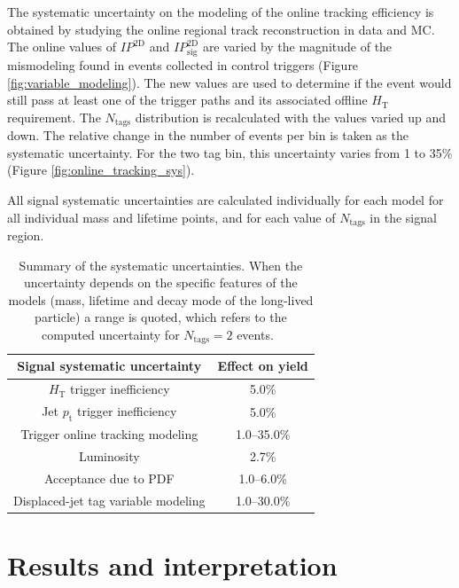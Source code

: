 The systematic uncertainty on the modeling of the online tracking
efficiency is obtained by studying the online regional track
reconstruction in data and MC. The online values of $IP^{\textrm{2D}}$
and $IP^{\textrm{2D}}_{\textrm{sig}}$ are varied by the magnitude of
the mismodeling found in events collected in control triggers (Figure \ref{fig:variable_modeling}).  The new values are used to determine if the
 event would still pass at
least one of the trigger paths and its associated offline
$H_{\textrm{T}}$ requirement. The $N_{\textrm{tags}}$ distribution is
recalculated with the values varied up and down. The relative change
in the number of events per bin is taken as the systematic
uncertainty. For the two tag bin, this uncertainty varies from
1 to 35\% (Figure \ref{fig:online_tracking_sys}).

All signal systematic uncertainties are calculated individually for
each model for all individual mass and lifetime points, and for each
value of $N_\text{tags}$ in the signal region.

\begin{table}[tb]
  \caption{Summary of the systematic uncertainties. 
    When the uncertainty depends on the specific features of the models
    (mass, lifetime and decay mode of the long-lived particle) a
    range is quoted, which refers to the computed uncertainty for $N_{\textrm{tags}}=2$ events.~\label{tab:sigSys}}
\begin{center}
\begin{tabular}{cc}
\textbf{Signal systematic uncertainty} & \textbf{Effect on yield} \\
\hline
$H_{\textrm{T}}$ trigger inefficiency &  5.0\% \\
Jet $p_{\textrm{t}}$ trigger inefficiency  & 5.0\% \\
Trigger online tracking modeling & 1.0--35.0\% \\
Luminosity & 2.7\% \\
Acceptance due to PDF & 1.0--6.0\% \\
Displaced-jet tag variable modeling & 1.0--30.0\% \\
\end{tabular}
\end{center}
\end{table}

\section{Results and interpretation}
\label{sec:results}

